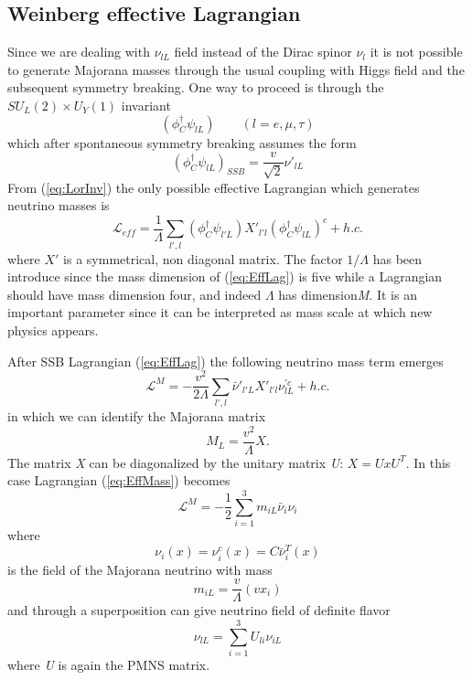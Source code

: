 \documentclass{subnucbo}
\begin{document}
\subsection{Weinberg effective Lagrangian}
Since we are dealing with $\nu_{lL}$ field instead of the Dirac spinor $\nu_l$ it is not possible to generate Majorana masses through the usual coupling with Higgs field and the subsequent symmetry breaking. 
One way to proceed is through the $SU_L(2)\times U_Y(1)$ invariant
\begin{equation}
\label{eq:LorInv}
(\phi_C^{\dagger}\psi_{lL})\qquad(l=e, \mu, \tau)
\end{equation}
which after spontaneous symmetry breaking assumes the form
\begin{equation}
(\phi_C^{\dagger}\psi_{lL})_{SSB}=\frac{v}{\sqrt{2}}\nu'_{lL}
\end{equation}
From (\ref{eq:LorInv}) the only possible effective Lagrangian which generates neutrino masses is
\begin{equation}
\label{eq:EffLag}
\mathcal{L}_{eff}=\frac{1}{\Lambda}\sum_{l',l}(\phi_C^{\dagger}\psi_{l'L})X'_{l'l}(\phi_C^{\dagger}\psi_{lL})^c+h.c.
\end{equation}
where $X'$ is a symmetrical, non diagonal matrix.
The factor $1/\Lambda$ has been introduce since the mass dimension of (\ref{eq:EffLag}) is five while a Lagrangian should have mass dimension four, and indeed $\Lambda$ has dimension\emph{M}.
It is an important parameter since it can be interpreted as mass scale at which new physics appears.

After SSB Lagrangian (\ref{eq:EffLag}) the following neutrino mass term emerges
\begin{equation}
\label{eq:EffMass}
\mathcal{L}^M=-\frac{v^2}{2\Lambda}\sum_{l',l}\bar{\nu}'_{l'L}X'_{l'l}\nu_{lL}^{'c}+h.c.
\end{equation}
in which we can identify the Majorana matrix
\begin{equation}
M_L=\frac{v^2}{\Lambda}X. %
\end{equation}
The matrix \emph{X} can be diagonalized by the unitary matrix \emph{U}: $X=UxU^T$. %
In this case Lagrangian (\ref{eq:EffMass}) becomes
\begin{equation}
\mathcal{L}^M=-\frac{1}{2}\sum_{i=1}^3m_{iL}\bar{\nu}_i\nu_i
\end{equation}
where
\begin{equation}
\label{eq:nuC}
\nu_i(x)=\nu_i^c(x)=C\bar{\nu}_i^T(x)
\end{equation}
is the field of the Majorana neutrino with mass 
\begin{equation}
\label{eq:neutMass}
m_{iL}=\frac{v}{\Lambda}(vx_i)
\end{equation}
and through a superposition can give neutrino field of definite flavor
\begin{equation}
\label{eq:nuMix}
\nu_{lL}=\sum_{i=1}^3U_{li}\nu_{iL}
\end{equation}
where \emph{U} is again the PMNS matrix.
\end{document}
